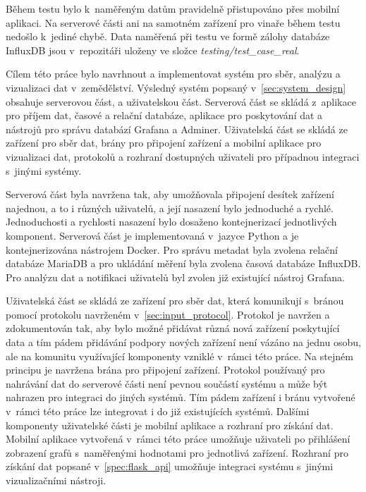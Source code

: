 Během testu bylo k~naměřeným datům pravidelně přistupováno přes mobilní aplikaci. Na serverové části ani na samotném zařízení pro vinaře během testu nedošlo k~jediné chybě. Data naměřená při testu ve formě zálohy databáze InfluxDB jsou v~repozitáři uloženy ve složce \textit{testing/test\_case\_real}.

Cílem této práce bylo navrhnout a implementovat systém pro sběr, analýzu a vizualizaci dat v~zemědělství. Výsledný systém popsaný v~\ref{sec:system_design} obsahuje serverovou část, a uživatelskou část. Serverová část se skládá z~aplikace pro příjem dat, časové a relační databáze, aplikace pro poskytování dat a nástrojů pro správu databází Grafana a Adminer. Uživatelská část se skládá ze zařízení pro sběr dat, brány pro připojení zařízení a mobilní aplikace pro vizualizaci dat, protokolů a rozhraní dostupných uživateli pro případnou integraci s~jinými systémy.

Serverová část byla navržena tak, aby umožňovala připojení desítek zařízení najednou, a to i různých uživatelů, a její nasazení bylo jednoduché a rychlé. Jednoduchosti a rychlosti nasazení bylo dosaženo kontejnerizací jednotlivých komponent. Serverová část je implementovaná v~jazyce Python a je kontejnerizována nástrojem Docker. Pro správu metadat byla zvolena relační databáze MariaDB a pro ukládání měření byla zvolena časová databáze InfluxDB. Pro analýzu dat a notifikaci uživatelů byl zvolen již existující nástroj Grafana.

Uživatelská část se skládá ze zařízení pro sběr dat, která komunikují s~bránou pomocí protokolu navrženém v~\ref{sec:input_protocol}. Protokol je navržen a zdokumentován tak, aby bylo možné přidávat různá nová zařízení poskytující data a tím pádem přidávání podpory nových zařízení není vázáno na jednu osobu, ale na komunitu využívající komponenty vzniklé v~rámci této práce. Na stejném principu je navržena brána pro připojení zařízení. Protokol používaný pro nahrávání dat do serverové části není pevnou součástí systému a může být nahrazen pro integraci do jiných systémů. Tím pádem zařízení i bránu vytvořené v~rámci této práce lze integrovat i do již existujících systémů. Dalšími komponenty uživatelské části je mobilní aplikace a rozhraní pro získání dat. Mobilní aplikace vytvořená v~rámci této práce umožňuje uživateli po přihlášení zobrazení grafů s~naměřenými hodnotami pro jednotlivá zařízení. Rozhraní pro získání dat popsané v~\ref{spec:flask_api} umožňuje integraci systému s~jinými vizualizačními nástroji.

